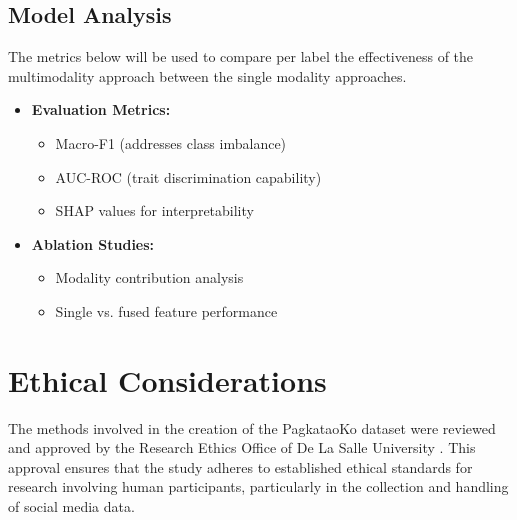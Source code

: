 \subsection{Model Analysis}
\label{subsec:analysis}
The metrics below will be used to compare per label the effectiveness of the multimodality approach between the single modality approaches.	 

\begin{itemize}
	\item \textbf{Evaluation Metrics:}
	\begin{itemize}
		\item Macro-F1 (addresses class imbalance)
		\item AUC-ROC (trait discrimination capability)
		\item SHAP values for interpretability
	\end{itemize}
	
	\item \textbf{Ablation Studies:}
	\begin{itemize}
		\item Modality contribution analysis
		\item Single vs. fused feature performance
	\end{itemize}
\end{itemize}

\section{Ethical Considerations}
\label{sec:Ethics}

The methods involved in the creation of the PagkataoKo dataset were reviewed and approved by the Research Ethics Office of De La Salle University \citep{Tighe_Acorda_Agno_Gano_Go_Santiago_Sedillo_2022}. This approval ensures that the study adheres to established ethical standards for research involving human participants, particularly in the collection and handling of social media data.

